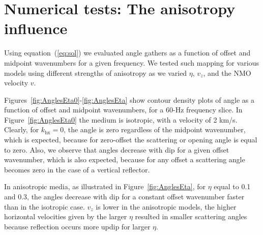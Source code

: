 \section{Numerical tests: The anisotropy influence}

Using equation~(\ref{eq:sol}) we evaluated angle gathers as a function
of offset and midpoint wavenumbers for a given frequency. We tested
such mapping for various models using different strengths of
anisotropy as we varied $\eta$, $v_z$, and the NMO velocity $v$.

Figures~\ref{fig:AnglesEta0}-\ref{fig:AnglesEta} show contour
density plots of angle  as a function of offset and
midpoint wavenumbers, for a 60-Hz frequency slice.  In Figure~\ref{fig:AnglesEta0} the
medium is isotropic, with a velocity of 2 km/s. Clearly, for
$k_{\text{hx}}=0$, the angle is zero regardless of the midpoint
wavenumber, which is expected, because for zero-offset the scattering or
opening angle is equal to zero. Also, we observe that angles
decrease with dip  for a given offset wavenumber, which is also
expected, because for any offset a scattering angle becomes zero in the case of a
vertical reflector. 

In anisotropic media, as illustrated in Figure~\ref{fig:AnglesEta},
for $\eta$ equal to 0.1 and 0.3,
the angles decrease with dip for a constant offset wavenumber faster
than in the isotropic case.   $v_z$ is lower in the
anisotropic models, the higher horizontal velocities given by the
larger $\eta$ resulted in smaller scattering angles because reflection
occurs more  updip  for larger $\eta$.

